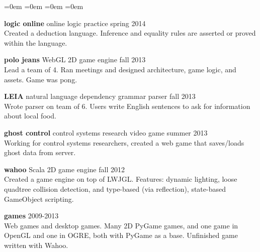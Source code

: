 \documentclass[margin]{res}
\newcommand{\tit}[1]{{
	\fontsize{11}{12}
	\selectfont
	\textbf{#1}
}}
\newenvironment{noindlist}
	{\begin{list}{}{
		\labelsep=0em \labelwidth=0em \leftmargin=0em \itemindent=0em
		\itemsep=3pt
	}}
	{\end{list}}
\begin{document}
\begin{resume}
\begin{noindlist}
	\item \tit{logic online} \enspace \small{online logic practice} \hfill \textsf{spring 2014} \\
	Created a deduction language. Inference and equality rules are asserted or proved within the language. 

	\item \tit{polo jeans} \enspace \small{WebGL 2D game engine} \hfill \textsf{fall 2013} \\
	Lead a team of 4. Ran meetings and designed architecture, game logic, and assets. Game was pong.
	
	\item \tit{LEIA} \enspace \small{natural language dependency grammar parser} \hfill \textsf{fall 2013} \\
	Wrote parser on team of 6. Users write English sentences to ask for information about local food.

	\item \tit{ghost control} \enspace \small{control systems research video game} \hfill \textsf{summer 2013} \\
	Working for control systems researchers, created a web game that saves/loads ghost data from server.

	\item \tit{wahoo} \enspace \small{Scala 2D game engine} \hfill \textsf{fall 2012} \hfill \\
	Created a game engine on top of LWJGL. Features: dynamic lighting, loose quadtree collision detection, and type-based (via reflection), state-based GameObject scripting.

	\item \tit{games} \hfill \textsf{2009-2013} \\
	Web games and desktop games. Many 2D PyGame games, and one game in OpenGL and one in OGRE, both with PyGame as a base. Unfinished game written with Wahoo.	

	\end{noindlist}

\end{resume}
\end{document}
